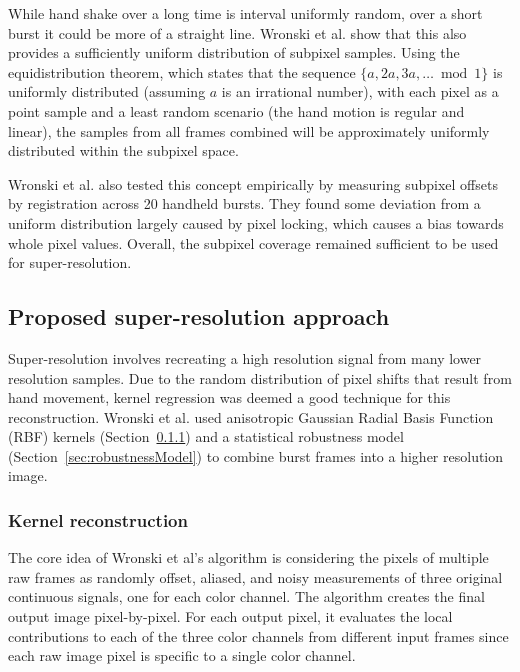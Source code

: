 \documentclass{sig-alternate}
\begin{document}
While hand shake over a long time is interval uniformly random, over a short burst it could be more of a straight line.
Wronski et al. show that this also provides a sufficiently uniform distribution of subpixel samples.
Using the equidistribution theorem, which states that the sequence $\{a,2a,3a,\dotsc \bmod 1\}$ is uniformly distributed (assuming $a$ is an irrational number), with each pixel as a point sample and a least random scenario (the hand motion is regular and linear), the samples from all frames combined will be approximately uniformly distributed within the subpixel space.

Wronski et al. also tested this concept empirically by measuring subpixel offsets by registration across 20 handheld bursts. They found some deviation from a uniform distribution largely caused by pixel locking, which causes a bias towards whole pixel values. Overall, the subpixel coverage remained sufficient to be used for super-resolution.

\subsection{Proposed super-resolution approach}

Super-resolution involves recreating a high resolution signal from many lower resolution samples. Due to the random distribution of pixel shifts that result from hand movement, kernel regression was deemed a good technique for this reconstruction. Wronski et al. used anisotropic Gaussian Radial Basis Function (RBF) kernels (Section~\ref{sec:kernelReconstruction}) and a statistical robustness model (Section~\ref{sec:robustnessModel}) to combine burst frames into a higher resolution image.

\subsubsection{Kernel reconstruction}
\label{sec:kernelReconstruction}

The core idea of Wronski et al's algorithm is considering the pixels of multiple raw frames as randomly offset, aliased, and noisy measurements of three original continuous signals, one for each color channel. The algorithm creates the final output image pixel-by-pixel. For each output pixel, it evaluates the local contributions to each of the three color channels from different input frames since each raw image pixel is specific to a single color channel. 
\end{document}
